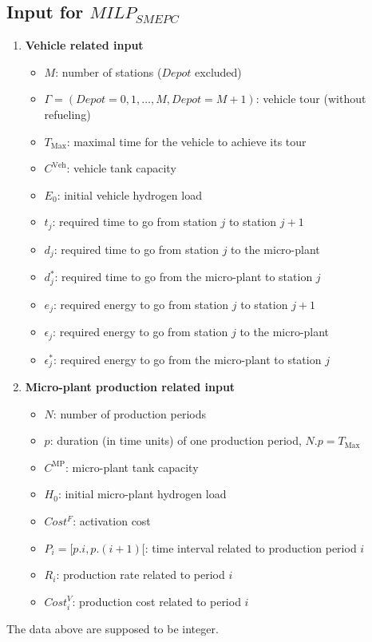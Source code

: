 \documentclass[11pt]{article}
\theoremstyle{plain}%
\theoremstyle{definition} \newtheorem{lem}{Lemma}[section]
\theoremstyle{definition} \newtheorem{claim}{Claim}[lem]
\theoremstyle{definition} \newtheorem{theorem}{Theorem}[section]
\theoremstyle{definition} \newtheorem{exo}{Exercice n$^\circ$}
\theoremstyle{definition} \newtheorem{quest}{}[exo]
\theoremstyle{definition} \newtheorem{sousquest}{}[quest]
\theoremstyle{remark}
\theoremstyle{definition}
\begin{document}
\subsection {Input for $MILP_{SMEPC}$}
%
\begin{enumerate} 
\item {\bf Vehicle related input}
\begin{itemize}
\item $M$: number of stations ($Depot$ excluded)
\item $\Gamma= (Depot=0, 1, \ldots,M,Depot = M + 1)$: vehicle tour (without refueling)
\item $T_{\textrm{Max}}$: maximal time for the vehicle to achieve its tour
\item $C^{\textrm{Veh}}$: vehicle tank capacity
\item $E_0$: initial vehicle hydrogen load
\item $t_j$: required time to go from station $j$ to station $j + 1$
\item $d_j$: required time to go from station $j$ to the micro-plant
\item $d^*_j$: required time to go from the micro-plant to station $j$
\item $e_j$: required energy to go from station $j$ to station $j + 1$
\item $\epsilon_j$: required energy to go from station $j$ to the micro-plant
\item $\epsilon^*_j$: required energy to go from the micro-plant to station $j$
\end{itemize}
\item {\bf Micro-plant production related input}
\begin{itemize}
\item $N$: number of production periods
\item $p$: duration (in time units) of one production period, $N.p=T_{\textrm{Max}}$
\item $C^{\textrm{MP}}$: micro-plant tank capacity
\item $H_0$: initial micro-plant hydrogen load
\item $Cost^F$: activation cost
\item $P_i = [p.i, p.(i + 1)[$: time interval related to production period $i$
\item $R_i$: production rate related to period $i$
\item $Cost^V_i$: production cost related to period $i$
\end{itemize}
\end{enumerate}
The data above are supposed to be integer.
%
\end{document}
